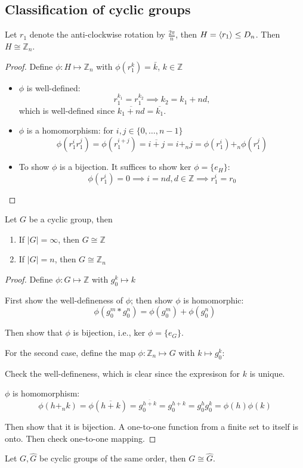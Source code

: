 \subsection{Classification of cyclic groups}
\begin{proposition}
Let $r_1$ denote the anti-clockwise rotation by $\frac{2\pi}{n}$, then $H=\langle r_1\rangle\le D_n$. Then $H\cong\mathbb{Z}_n$.
\end{proposition}
\begin{proof}
Define $\phi: H\mapsto\mathbb{Z}_n$ with $\phi(r_1^k)=\bar k$, $k\in\mathbb{Z}$
\begin{itemize}
\item
$\phi$ is well-defined:
\[
r_1^{k_1}=r_1^{k_2}\implies
k_2=k_1+nd,
\]
which is well-defined since $\overline{k_1+nd}=\overline{k_1}$.
\item
$\phi$ is a homomorphism: for $i,j\in\{0,\dots,n-1\}$
\[
\phi(r_1^ir_1^j)=\phi(r_1^{i+j})=\overline{i+j}=i+_nj=\phi(r_1^i)+_n\phi(r_1^j)
\]
\item
To show $\phi$ is a bijection. It suffices to show $\mbox{ker }\phi=\{e_H\}$:
\[
\phi(r_1^i)=0\implies i=nd,d\in\mathbb{Z}\implies
r_1^i=r_0
\]
\end{itemize}



\end{proof}

\begin{theorem}
Let $G$ be a cyclic group, then
\begin{enumerate}
\item
If $|G|=\infty$, then $G\cong\mathbb{Z}$
\item
If $|G|=n$, then $G\cong\mathbb{Z}_n$
\end{enumerate}
 
\end{theorem}
\begin{proof}
Define $\phi:G\mapsto\mathbb{Z}$ with $g_0^k\mapsto k$

First show the well-defineness of $\phi$; then show $\phi$ is homomorphic:
\[
\phi(g_0^m*g_0^n)=\phi(g_0^m)+\phi(g_0^n)
\]

Then show that $\phi$ is bijection, i.e., $\mbox{ker }\phi=\{e_G\}.$

For the second case, define the map $\phi:\mathbb{Z}_n\mapsto G$ with $k\mapsto g_0^k$:

Check the well-defineness, which is clear since the expresison for $k$ is unique.

$\phi$ is homomorphism:
\[
\phi(h+_nk)=\phi(\overline{h+k})=g_0^{\overline{h+k}}
=g_0^{h+k}=g_0^hg_0^k=\phi(h)\phi(k)
\]

Then show that it is bijection. A one-to-one function from a finite set to itself is onto. Then check one-to-one mapping.

\end{proof}
\begin{corollary}
Let $G,\hat G$ be cyclic groups of the same order, then $G\cong \hat G$.
\end{corollary}

